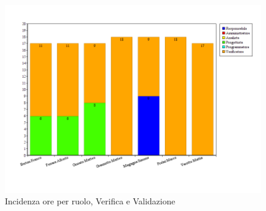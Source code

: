 \begin{figure}[H]
	\centering
	\includegraphics[scale=0.4]{immagini/Grafi/GrafoVV}
	\caption{Incidenza ore per ruolo, Verifica e Validazione}
\end{figure}

